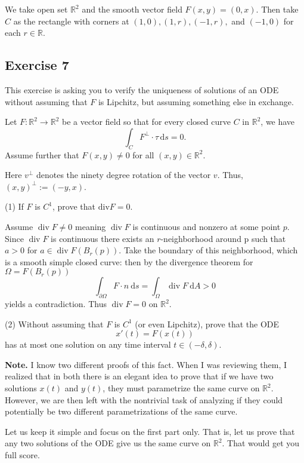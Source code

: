 \documentclass{amsart}
\newcommand{\R}{\mathbb R}
\newcommand{\dd}{\mathrm d}
\DeclareMathOperator{\dv}{div}
\newcommand{\note}{\noindent \textbf{Note. }}
\begin{document}
\medskip \noindent We take open set $\mathbb{R}^2$ and the smooth vector field $F(x,y)=(0,x)$. Then take
$C$ as the rectangle with corners at $(1, 0), (1, r), (-1, r),$ and $(-1, 0)$ for each $r\in\mathbb{R}$. 

\bigskip

\subsection*{Exercise 7} This exercise is asking you to verify the uniqueness of solutions of an ODE without assuming that $F$ is Lipchitz, but assuming something else in exchange. 

\medskip \noindent Let $F : \R^2 \to \R^2$ be a vector field so that for every closed curve $C$ in $\R^2$, we have
\[ \int_C F^\perp \cdot \tau \, \dd s = 0.\]
Assume further that $F(x,y) \neq 0$ for all $(x,y) \in \R^2$.

\medskip \noindent Here $v^\perp$ denotes the ninety degree rotation of the vector $v$. Thus, $(x,y)^\perp := (-y,x)$.

(1) If $F$ is $C^1$, prove that $\mathrm{div } F = 0$.

\medskip \noindent Assume $\dv F\neq 0$ meaning $\dv F$ is continuous and nonzero at some point $p$. Since 
$\dv F$ is continuous there exists an $r$-neighborhood around p such that $a>0$ for $a\in\dv F(B_r(p))$. Take
the boundary of this neighborhood, which is a smooth simple closed curve: then by the divergence theorem for
$\Omega=F(B_r(p))$
\[\int_{\partial\Omega}F\cdot n\:\dd s =\int_{\Omega}\dv F\:\dd A > 0\] yields a contradiction.
Thus $\dv F = 0$ on $\mathbb{R}^2$. 

\bigskip

(2) Without assuming that $F$ is $C^1$ (or even Lipchitz), prove that the ODE
\[ x'(t) = F(x(t))\]
has at most one solution on any time interval $t \in (-\delta,\delta)$.

\note I know two different proofs of this fact. When I was reviewing them, I realized that in both there is an elegant idea to prove that if we have two solutions $x(t)$ and $y(t)$, they must parametrize the same curve on $\R^2$. However, we are then left with the nontrivial task of analyzing if they could potentially be two different parametrizations of the same curve.

\medskip \noindent Let us keep it simple and focus on the first part only. That is, let us prove that any two solutions of the ODE give us the same curve on $\R^2$. That would get you full score.
\end{document}
